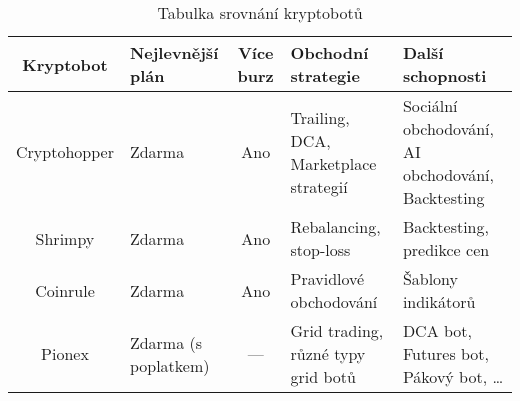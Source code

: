 \begin{table}
    \begin{center}
        \begin{tabular}[h]{|c|p{2.5cm}|c|p{4cm}|p{4cm}|}
            \hline
            Kryptobot    & Nejlevnější plán     & Více burz & Obchodní strategie                   & Další schopnosti                                  \\
            \hline
            Cryptohopper & Zdarma               & Ano       & Trailing, DCA, Marketplace strategií & Sociální obchodování, AI obchodování, Backtesting \\
            Shrimpy      & Zdarma               & Ano       & Rebalancing, stop-loss               & Backtesting, predikce cen                         \\
            Coinrule     & Zdarma               & Ano       & Pravidlové obchodování               & Šablony indikátorů                                \\
            Pionex       & Zdarma (s poplatkem) & ---       & Grid trading, různé typy grid botů   & DCA bot, Futures bot, Pákový bot, \ldots          \\
            \hline
        \end{tabular}
        \caption{\label{tab:cryptobots}Tabulka srovnání kryptobotů}
    \end{center}
\end{table}

\endinput